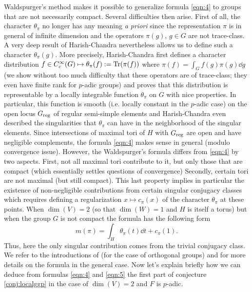 Waldspurger's method makes it possible to generalize formula \eqref{eqn:4} to groups that are not necessarily compact.
Several difficulties then arise.
First of all, the character $\theta_\pi$ no
longer has any meaning \emph{a priori} since the representation $\pi$ is in general of infinite dimension and the operators $\pi(g)$, $g \in G$ are not trace-class. 
A very deep result of Harish-Chandra nevertheless allows us to define such a character $\theta_\pi(g)$.
More precisely, Harish-Chandra first defines a character distribution $f \in C_c^\infty(G) \mapsto \theta_\pi(f):= \mathrm{Tr}(\pi(f))$ where $\pi(f) = \int_G f(g)\pi(g) \dd g$ (we show without too much difficulty that these
operators are of trace-class; they even have finite rank for $p$-adic groups) and proves that this distribution is representable by a locally integrable function $\theta_\pi$ on $G$ with nice properties.
In particular, this function is smooth (i.e. locally constant in the $p$-adic case) on the open locus $G_{\mathrm{reg}}$ of regular semi-simple elements and Harish-Chandra even described the singularities that $\theta_\pi$ can have in the neighborhood of the singular elements. 
Since intersections of maximal tori of $H$ with $G_{\mathrm{reg}}$ are open and have negligible complements, the formula \eqref{eqn:4} makes sense in general (modulo convergence issue).
However, the Waldspurger's formula differs from \eqref{eqn:4} by two aspects.
First, not all maximal tori contribute to it, but only those that are compact (which essentially settles questions of convergence)
Secondly, certain tori are not maximal (but still compact).
This last property implies in particular the existence of non-negligible contributions from certain singular conjugacy classes which requires defining a regularization $x \mapsto c_\pi(x)$ of the character $\theta_\pi$  at these points.
When $\dim(V) = 2$ (so that $\dim(W) = 1$ and $H$ is itself a torus) but when the group $G$ is not compact the formula has the following form
\begin{equation}
\label{eqn:5}
    m(\pi) = \int_H \theta_\pi(t) \dd t + c_\pi(1).
\end{equation}
Thus, here the only singular contribution comes from the trivial conjugacy class.
We refer to the introductions of \cite{waldspurger2010formule} (for the case of orthogonal groups) and \cite{beuzart2016conjecture} for more details on the formula in the general case.
Now let's explain briefly how we can deduce from formulas \eqref{eqn:4} and \eqref{eqn:5} the first part of conjecture \ref{conj:localggp} in the case of $\dim(V) = 2$ and $F$ is $p$-adic.

